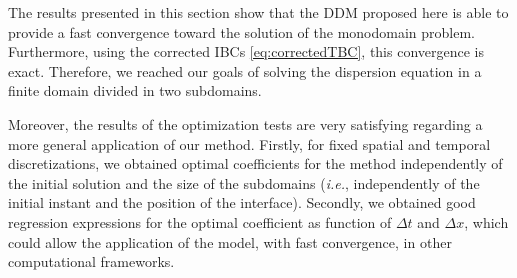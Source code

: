 \indent The results presented in this section show that the DDM proposed here is able to provide a fast convergence toward the solution of the monodomain problem. Furthermore, using the corrected IBCs \eqref{eq:correctedTBC}, this convergence is exact. Therefore, we reached our goals of solving the dispersion equation in a finite domain divided in two subdomains.

\indent Moreover, the results of the optimization tests are very satisfying regarding a more general application of our method. Firstly, for fixed spatial and temporal discretizations, we obtained optimal coefficients for the method independently of the initial solution and the size of the subdomains (\emph{i.e.}, independently of the initial instant and the position of the interface). Secondly, we obtained good regression expressions for the optimal coefficient as function of $\Delta t$ and $\Delta x$, which could allow the application of the model, with fast convergence, in other computational frameworks.













